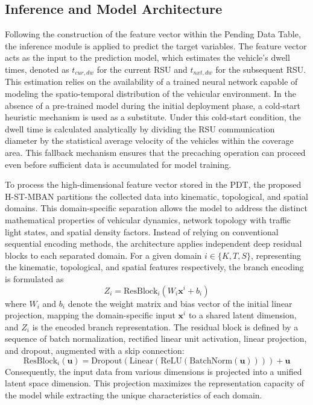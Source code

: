 \documentclass[journal]{IEEEtran}
\begin{document}
\subsection{Inference and Model Architecture}

Following the construction of the feature vector within the Pending Data Table, the inference module is applied to predict the target variables. The feature vector acts as the input to the prediction model, which estimates the vehicle's dwell times, denoted as $t_{cur, dw}$ for the current RSU and $t_{nxt, dw}$ for the subsequent RSU. This estimation relies on the availability of a trained neural network capable of modeling the spatio-temporal distribution of the vehicular environment. In the absence of a pre-trained model during the initial deployment phase, a cold-start heuristic mechanism is used as a substitute. Under this cold-start condition, the dwell time is calculated analytically by dividing the RSU communication diameter by the statistical average velocity of the vehicles within the coverage area. This fallback mechanism ensures that the precaching operation can proceed even before sufficient data is accumulated for model training.

To process the high-dimensional feature vector stored in the PDT, the proposed H-ST-MBAN partitions the collected data into kinematic, topological, and spatial domains. This domain-specific separation allows the model to address the distinct mathematical properties of vehicular dynamics, network topology with traffic light states, and spatial density factors. Instead of relying on conventional sequential encoding methods, the architecture applies independent deep residual blocks to each separated domain. For a given domain $i \in \{K, T, S\}$, representing the kinematic, topological, and spatial features respectively, the branch encoding is formulated as
\begin{equation}
Z_i = \text{ResBlock}_i(W_i \mathbf{x}^i + b_i)
\label{eq:branch_enc}
\end{equation}
where $W_i$ and $b_i$ denote the weight matrix and bias vector of the initial linear projection, mapping the domain-specific input $\mathbf{x}^i$ to a shared latent dimension, and $Z_i$ is the encoded branch representation. The residual block is defined by a sequence of batch normalization, rectified linear unit activation, linear projection, and dropout, augmented with a skip connection:
\begin{equation}
\text{ResBlock}_i(\mathbf{u}) = \text{Dropout}(\text{Linear}(\text{ReLU}(\text{BatchNorm}(\mathbf{u})))) + \mathbf{u}
\label{eq:resblock}
\end{equation}
Consequently, the input data from various dimensions is projected into a unified latent space dimension. This projection maximizes the representation capacity of the model while extracting the unique characteristics of each domain.
\end{document}
